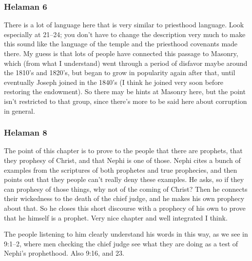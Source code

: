 	\subsubsection{Helaman 6} %
	
		\begin{compactdesc}
		
		\item[21--31$\vert$]
		\begin{compactdesc}
		\item[The robbers' covenants] There is a lot of language here that is very similar to priesthood language. Look especially at 21--24; you don't have to change the description very much to make this sound like the language of the temple and the priesthood covenants made there. My guess is that lots of people have connected this passage to Masonry, which (from what I understand) went through a period of disfavor maybe around the 1810's and 1820's, but began to grow in popularity again after that, until eventually Joseph joined in the 1840's (I think he joined very soon before restoring the endowment). So there may be hints at Masonry here, but the point isn't restricted to that group, since there's more to be said here about corruption in general.
		\end{compactdesc}
		
		\end{compactdesc} 
		
	\subsubsection{Helaman 8} %
	
		The point of this chapter is to prove to the people that there are prophets, that they prophesy of Christ, and that Nephi is one of those. Nephi cites a bunch of examples from the scriptures of both prophetes and true prophecies, and then points out that they people can't really deny these examples. He asks, so if they can prophesy of those things, why not of the coming of Christ? Then he connects their wickedness to the death of the chief judge, and he makes his own prophecy about that. So he closes this short discourse with a prophecy of his own to prove that he himself is a prophet. Very nice chapter and well integrated I think.
		
		The people listening to him clearly understand his words in this way, as we see in 9:1--2, where men checking the chief judge see what they are doing as a test of Nephi's prophethood. Also 9:16, and 23.
		
